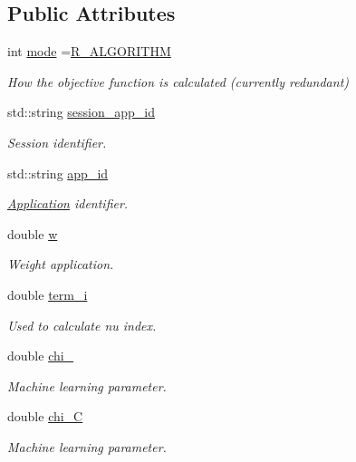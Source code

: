 \subsection*{Public Attributes}
\begin{DoxyCompactItemize}
\item 
int \hyperlink{classApplication_abc7e87e8cbe2e64fa4e2ff2afdf7a4fc}{mode} =\hyperlink{application_8hh_aaeed326368abd712225f9ca34c338fbf}{R\-\_\-\-A\-L\-G\-O\-R\-I\-T\-H\-M}
\begin{DoxyCompactList}\small\item\em How the objective function is calculated (currently redundant) \end{DoxyCompactList}\item 
std\-::string \hyperlink{classApplication_a5e28ffadb86925ecae57ab18c0085d90}{session\-\_\-app\-\_\-id}
\begin{DoxyCompactList}\small\item\em Session identifier. \end{DoxyCompactList}\item 
std\-::string \hyperlink{classApplication_a05377e6cdcb9d48f29e0f1972a4a16fe}{app\-\_\-id}
\begin{DoxyCompactList}\small\item\em \hyperlink{classApplication}{Application} identifier. \end{DoxyCompactList}\item 
double \hyperlink{classApplication_aead1b7b0150c2a3ebd6c36b1db8c4732}{w}
\begin{DoxyCompactList}\small\item\em Weight application. \end{DoxyCompactList}\item 
double \hyperlink{classApplication_ad5486702327ad61e56ed04fb54d58c20}{term\-\_\-i}
\begin{DoxyCompactList}\small\item\em Used to calculate nu index. \end{DoxyCompactList}\item 
double \hyperlink{classApplication_a3b9dab40d189989c836b8d328946bbb6}{chi\-\_}
\begin{DoxyCompactList}\small\item\em Machine learning parameter. \end{DoxyCompactList}\item 
double \hyperlink{classApplication_a46e29a6bfc74de610feec809a77dfb62}{chi\-\_\-\-C}
\begin{DoxyCompactList}\small\item\em Machine learning parameter. \end{DoxyCompactList}\item 

\end{DoxyCompactItemize}
